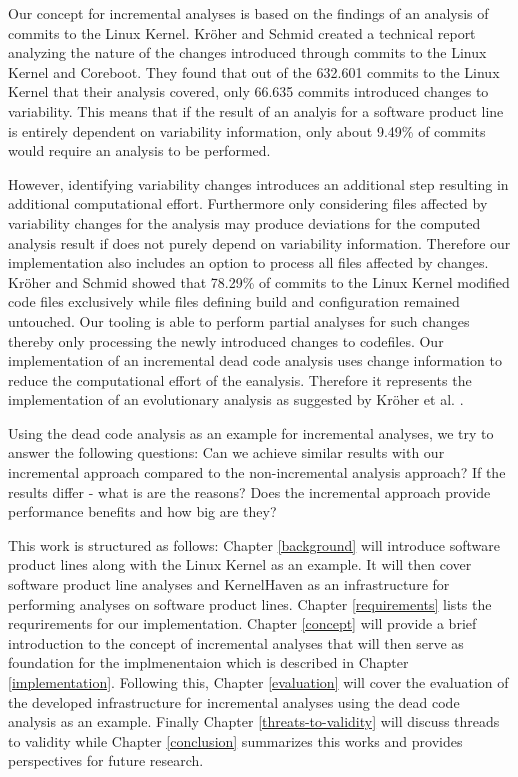 \documentclass[a4paper]{article}
\begin{document}
Our concept for incremental analyses is based on the findings of an analysis of commits to the Linux Kernel. Kr\"oher and Schmid \cite{ComAn} created a technical report analyzing the nature of the changes introduced through commits to the Linux Kernel and Coreboot. They found that out of the 632.601 commits to the Linux Kernel that their analysis covered, only 66.635 commits introduced changes to variability. This means that if the result of an analyis for a software product line is entirely dependent on variability information, only about 9.49\% of commits would require an analysis to be performed. 

However, identifying variability changes introduces an additional step resulting in additional computational effort. Furthermore only considering files affected by variability changes for the analysis may produce deviations for the computed analysis result if does not purely depend on variability information. Therefore our implementation also includes an option to process all files affected by changes.  Kr\"oher and Schmid \cite{ComAn} showed that 78.29\% of commits to the Linux Kernel modified code files exclusively while files defining build and configuration remained untouched. Our tooling is able to perform partial analyses for such changes thereby only processing the newly introduced changes to codefiles.  Our implementation of an incremental dead code analysis uses change information to reduce the computational effort of the eanalysis. Therefore it represents the implementation of an evolutionary analysis as suggested by Kr\"oher et al. \cite{ComAn-splc}. 

Using the dead code analysis as an example for incremental analyses, we try to answer the following questions: Can we achieve similar results with our incremental approach compared to the non-incremental analysis approach? If the results differ - what is are the reasons?  Does the incremental approach provide performance benefits and how big are they?

This work is structured as follows: Chapter \ref{background} will introduce software product lines along with the Linux Kernel as an example. It will then cover software product line analyses and KernelHaven as an infrastructure for performing analyses on software product lines. Chapter \ref{requirements} lists the requrirements for our implementation. Chapter \ref{concept} will provide a brief introduction to the concept of incremental analyses that will then serve as foundation for the implmenentaion which is described in Chapter \ref{implementation}. Following this, Chapter \ref{evaluation} will cover the evaluation of the developed infrastructure for incremental analyses using the dead code analysis as an example. Finally Chapter \ref{threats-to-validity} will discuss threads to validity while Chapter \ref{conclusion} summarizes this works and provides perspectives for future research.
\end{document}
